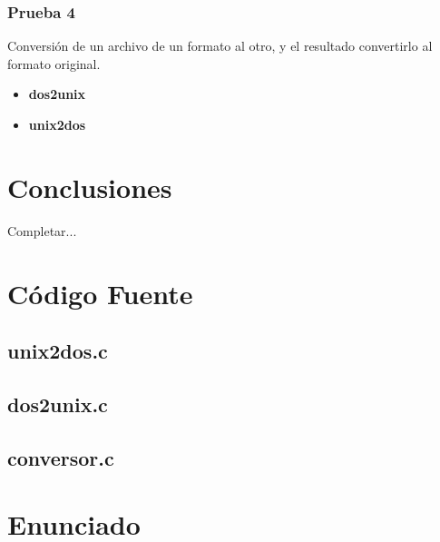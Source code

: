 \documentclass[a4paper,10pt]{article}
\begin{document}
    \subsubsection{Prueba 4}
    Conversi\'on de un archivo de un formato al otro, y el resultado convertirlo al formato original.
      \begin{itemize}
      \item \textbf{dos2unix}
      \item \textbf{unix2dos}
      \end{itemize}
\section{Conclusiones}
Completar...


\appendix
\newpage
\section{C\'odigo Fuente}
  \subsection{unix2dos.c}
    \lstset{numbers=left, frame=single, breaklines=true}
    
  \subsection{dos2unix.c}
    \lstset{numbers=left, frame=single, breaklines=true}
    
  \subsection{conversor.c}
    \lstset{numbers=left, frame=single, breaklines=true}
    

\newpage
\section{Enunciado}

\end{document}
